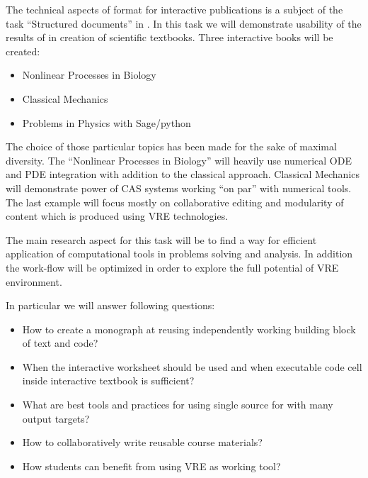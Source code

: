 \begin{workpackage}[id=dissem,wphases=18-48!.5,
  title=Dissemination,
  SARM=1,
  USORM=10,
  USHRM=8,
  USRM=24
]
\begin{tasklist}
\begin{task}[title=Demonstrator: interactive books,
id=ibook]
The technical aspects of format for interactive publications is a
subject of the task ``Structured documents'' in
. In this task we will demonstrate usability
of the results of  in creation of scientific
textbooks. Three interactive books will be created:

\begin{itemize}
\item Nonlinear Processes in Biology 
\item Classical Mechanics  
\item Problems  in Physics with Sage/python    
\end{itemize}

The choice of those particular topics has been made for the sake of maximal diversity. The ``Nonlinear Processes in Biology'' will heavily use numerical ODE and PDE integration with addition to the classical approach. Classical Mechanics will demonstrate power of CAS systems working ``on par'' with numerical tools. The last example will focus mostly on collaborative editing and modularity of content which is produced using VRE technologies. 

The main research aspect for this task will be to find a way for efficient application of computational tools in problems solving and analysis. In addition the work-flow will be optimized in order to explore the full potential of VRE environment. 

In particular we will answer following questions:

\begin{itemize}
\item How to create a monograph at reusing independently working   building block of text and code?
\item When the interactive worksheet should be used and when  executable code cell inside interactive textbook is sufficient?
\item What are best tools and practices for using single source for with many output targets? 
\item How to collaboratively write reusable course materials?
\item How students can benefit from  using VRE as working tool?
\end{itemize}


\end{task}

\end{tasklist}




\end{workpackage}
